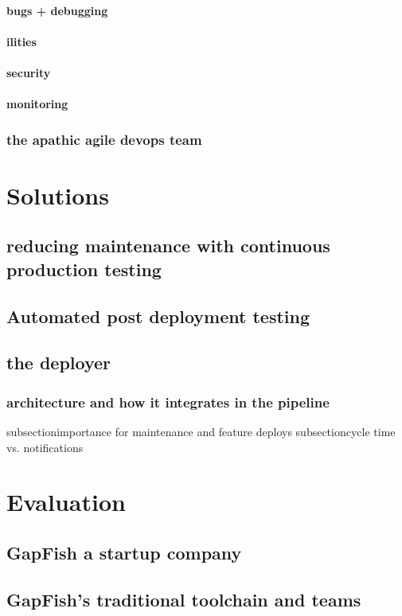 \subsubsection{bugs + debugging}
\subsubsection{ilities}
\subsubsection{security}
\subsubsection{monitoring}

\subsection{the apathic agile devops team}

\chapter{Solutions}
\section{reducing maintenance with continuous production testing}
\section{Automated post deployment testing}
\section{the deployer}
\subsection{architecture and how it integrates in the pipeline}
subsection{importance for maintenance and feature deploys}
subsection{cycle time vs. notifications}

\chapter{Evaluation}
\section{GapFish a startup company}
\section{GapFish's traditional toolchain and teams}

